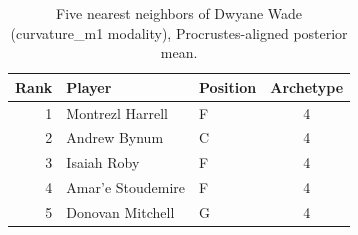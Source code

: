 \begin{table}[htbp]
  \centering\small
  \begin{tabular}{rllc}
    \toprule
    Rank & Player & Position & Archetype \\
    \midrule
    1 & Montrezl Harrell & F & 4 \\
    2 & Andrew Bynum & C & 4 \\
    3 & Isaiah Roby & F & 4 \\
    4 & Amar'e Stoudemire & F & 4 \\
    5 & Donovan Mitchell & G & 4 \\
    \bottomrule
  \end{tabular}
  \caption{Five nearest neighbors of Dwyane Wade (curvature_m1 modality), Procrustes-aligned posterior mean.}
  \label{tab:Dwyane_Wade_neighbors_curvature_m1}
\end{table}

